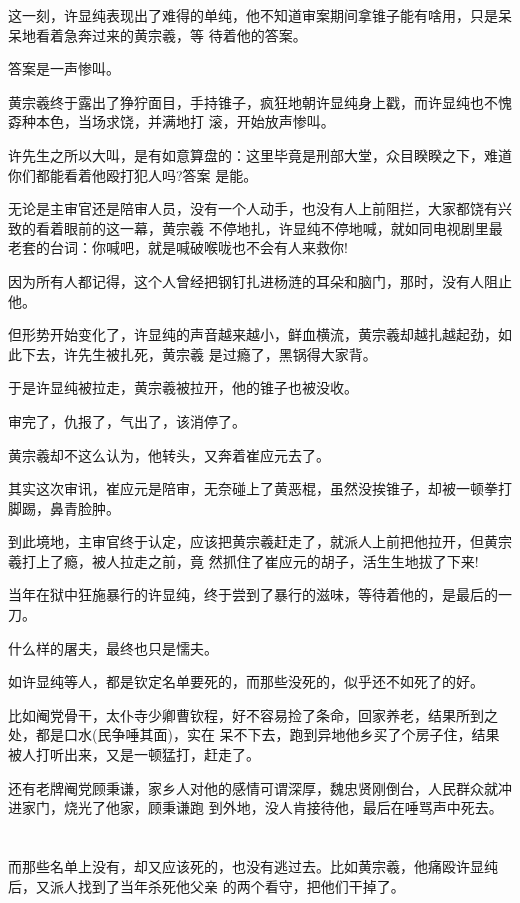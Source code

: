 \documentclass[11pt,a4paper,onecolumn]{article}
\begin{document}
这一刻，许显纯表现出了难得的单纯，他不知道审案期间拿锥子能有啥用，只是呆呆地看着急奔过来的黄宗羲，等
待着他的答案。

答案是一声惨叫。

黄宗羲终于露出了狰狞面目，手持锥子，疯狂地朝许显纯身上戳，而许显纯也不愧孬种本色，当场求饶，并满地打
滚，开始放声惨叫。

许先生之所以大叫，是有如意算盘的：这里毕竟是刑部大堂，众目睽睽之下，难道你们都能看着他殴打犯人吗?答案
是能。

无论是主审官还是陪审人员，没有一个人动手，也没有人上前阻拦，大家都饶有兴致的看着眼前的这一幕，黄宗羲
不停地扎，许显纯不停地喊，就如同电视剧里最老套的台词：你喊吧，就是喊破喉咙也不会有人来救你!

因为所有人都记得，这个人曾经把钢钉扎进杨涟的耳朵和脑门，那时，没有人阻止他。

但形势开始变化了，许显纯的声音越来越小，鲜血横流，黄宗羲却越扎越起劲，如此下去，许先生被扎死，黄宗羲
是过瘾了，黑锅得大家背。

于是许显纯被拉走，黄宗羲被拉开，他的锥子也被没收。

审完了，仇报了，气出了，该消停了。

黄宗羲却不这么认为，他转头，又奔着崔应元去了。

其实这次审讯，崔应元是陪审，无奈碰上了黄恶棍，虽然没挨锥子，却被一顿拳打脚踢，鼻青脸肿。

到此境地，主审官终于认定，应该把黄宗羲赶走了，就派人上前把他拉开，但黄宗羲打上了瘾，被人拉走之前，竟
然抓住了崔应元的胡子，活生生地拔了下来!

当年在狱中狂施暴行的许显纯，终于尝到了暴行的滋味，等待着他的，是最后的一刀。

什么样的屠夫，最终也只是懦夫。

如许显纯等人，都是钦定名单要死的，而那些没死的，似乎还不如死了的好。

比如阉党骨干，太仆寺少卿曹钦程，好不容易捡了条命，回家养老，结果所到之处，都是口水(民争唾其面)，实在
呆不下去，跑到异地他乡买了个房子住，结果被人打听出来，又是一顿猛打，赶走了。

还有老牌阉党顾秉谦，家乡人对他的感情可谓深厚，魏忠贤刚倒台，人民群众就冲进家门，烧光了他家，顾秉谦跑
到外地，没人肯接待他，最后在唾骂声中死去。

\section[\thesection]{}

而那些名单上没有，却又应该死的，也没有逃过去。比如黄宗羲，他痛殴许显纯后，又派人找到了当年杀死他父亲
的两个看守，把他们干掉了。
\end{document}
